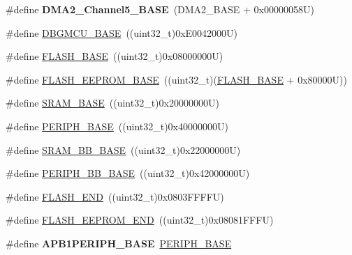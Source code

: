 \begin{DoxyCompactItemize}
\item 
\hypertarget{group___peripheral__memory__map_ga1eea983a5d68bf36f4d19fbb07955ca1}{\#define {\bfseries D\-M\-A2\-\_\-\-Channel5\-\_\-\-B\-A\-S\-E}~(D\-M\-A2\-\_\-\-B\-A\-S\-E + 0x00000058\-U)}\label{group___peripheral__memory__map_ga1eea983a5d68bf36f4d19fbb07955ca1}

\item 
\#define \hyperlink{group___peripheral__memory__map_ga4adaf4fd82ccc3a538f1f27a70cdbbef}{D\-B\-G\-M\-C\-U\-\_\-\-B\-A\-S\-E}~((uint32\-\_\-t)0x\-E0042000\-U)
\item 
\#define \hyperlink{group___peripheral__memory__map_ga23a9099a5f8fc9c6e253c0eecb2be8db}{F\-L\-A\-S\-H\-\_\-\-B\-A\-S\-E}~((uint32\-\_\-t)0x08000000\-U)
\item 
\#define \hyperlink{group___peripheral__memory__map_ga45b9071c81cb72a66e2e3195343fcb3a}{F\-L\-A\-S\-H\-\_\-\-E\-E\-P\-R\-O\-M\-\_\-\-B\-A\-S\-E}~((uint32\-\_\-t)(\hyperlink{group___peripheral__memory__map_ga23a9099a5f8fc9c6e253c0eecb2be8db}{F\-L\-A\-S\-H\-\_\-\-B\-A\-S\-E} + 0x80000\-U))
\item 
\#define \hyperlink{group___peripheral__memory__map_ga05e8f3d2e5868754a7cd88614955aecc}{S\-R\-A\-M\-\_\-\-B\-A\-S\-E}~((uint32\-\_\-t)0x20000000\-U)
\item 
\#define \hyperlink{group___peripheral__memory__map_ga9171f49478fa86d932f89e78e73b88b0}{P\-E\-R\-I\-P\-H\-\_\-\-B\-A\-S\-E}~((uint32\-\_\-t)0x40000000\-U)
\item 
\#define \hyperlink{group___peripheral__memory__map_gad3548b6e2f017f39d399358f3ac98454}{S\-R\-A\-M\-\_\-\-B\-B\-\_\-\-B\-A\-S\-E}~((uint32\-\_\-t)0x22000000\-U)
\item 
\#define \hyperlink{group___peripheral__memory__map_gaed7efc100877000845c236ccdc9e144a}{P\-E\-R\-I\-P\-H\-\_\-\-B\-B\-\_\-\-B\-A\-S\-E}~((uint32\-\_\-t)0x42000000\-U)
\item 
\#define \hyperlink{group___peripheral__memory__map_ga8be554f354e5aa65370f6db63d4f3ee4}{F\-L\-A\-S\-H\-\_\-\-E\-N\-D}~((uint32\-\_\-t)0x0803\-F\-F\-F\-F\-U)
\item 
\#define \hyperlink{group___peripheral__memory__map_gac8cb9b66893a7c4bdff3258909af027a}{F\-L\-A\-S\-H\-\_\-\-E\-E\-P\-R\-O\-M\-\_\-\-E\-N\-D}~((uint32\-\_\-t)0x08081\-F\-F\-F\-U)
\item 
\hypertarget{group___peripheral__memory__map_ga45666d911f39addd4c8c0a0ac3388cfb}{\#define {\bfseries A\-P\-B1\-P\-E\-R\-I\-P\-H\-\_\-\-B\-A\-S\-E}~\hyperlink{group___peripheral__memory__map_ga9171f49478fa86d932f89e78e73b88b0}{P\-E\-R\-I\-P\-H\-\_\-\-B\-A\-S\-E}}\label{group___peripheral__memory__map_ga45666d911f39addd4c8c0a0ac3388cfb}


\end{DoxyCompactItemize}
